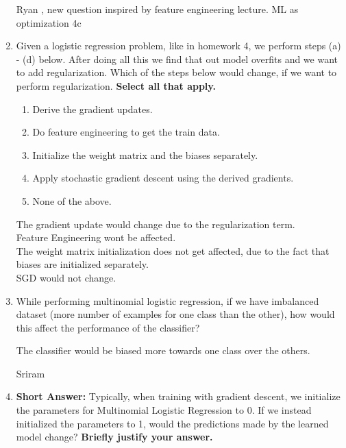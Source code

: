 \begin{enumerate}
    \begin{qauthor}
    Ryan , new question inspired by feature engineering lecture. ML as optimization 4c
    \end{qauthor}
    
        
    \item Given a logistic regression problem, like in homework 4, we perform steps (a) - (d) below. After doing all this we find that out model overfits and we want to add regularization. Which of the steps below would change, if we want to perform regularization. \textbf{Select all that apply.}
    
    \begin{enumerate}
        \item Derive the gradient updates.
        \item Do feature engineering to get the train data.
        \item Initialize the weight matrix and the biases separately.
        \item Apply stochastic gradient descent using the derived gradients.
        \item None of the above.
    \end{enumerate}
    
    \begin{soln}
    The gradient update would change due to the regularization term.\\
    Feature Engineering wont be affected.\\
    The weight matrix initialization does not get affected, due to the fact that biases are initialized separately.\\
    SGD would not change.
    \end{soln}
    
\item While performing multinomial logistic regression, if we have imbalanced dataset (more number of examples for one class than the other), how would this affect the performance of the classifier?
\begin{soln}
The classifier would be biased more towards one class over the others.  \\
    \end{soln}
    \begin{qauthor}
    Sriram
    \end{qauthor}

    
    \item \textbf{Short Answer:} Typically, when training with gradient descent, we initialize the parameters for Multinomial Logistic Regression to 0. 
    If we instead initialized the parameters to 1, would the predictions made by the learned model change? \textbf{Briefly justify your answer.}
    

\end{enumerate}
